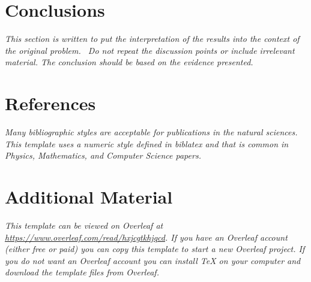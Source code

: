 \documentclass[11pt,a4paper,oneside]{report}
\newcommand{\instructions}[1]{{\color{orange}\itshape #1}}
\begin{document}



\chapter{Conclusions}
\label{conclusions}

\instructions{This section is written to put the interpretation of the results
    into the context of the original problem.~ Do not repeat the discussion
    points or include irrelevant material. The conclusion should be based on
    the evidence presented.}




\chapter*{References}
\label{references}


\instructions{Many bibliographic styles are acceptable for publications
    in the natural sciences. This template uses a numeric style defined in biblatex
    and that is common in Physics, Mathematics, and Computer Science papers.}

\printbibliography[heading=none]


\appendix

\chapter{Additional Material}
\label{appendix-a}

\instructions{This template can be viewed on Overleaf at
    \url{https://www.overleaf.com/read/hxjcgtkhjqcd}.  If you have an Overleaf
    account (either free or paid) you can copy this template to start a new
    Overleaf project.  If you do not want an Overleaf account you can install
    TeX on your computer and download the template files from Overleaf.  }
\end{document}
